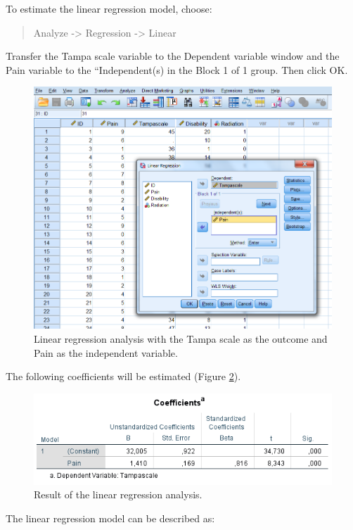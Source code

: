 \documentclass[]{book}
\theoremstyle{definition}
\theoremstyle{definition}
\theoremstyle{definition}
\theoremstyle{remark}
\begin{document}
To estimate the linear regression model, choose:

\begin{quote}
Analyze -\textgreater{} Regression -\textgreater{} Linear
\end{quote}

Transfer the Tampa scale variable to the Dependent variable window and
the Pain variable to the ``Independent(s) in the Block 1 of 1 group.
Then click OK.

\begin{figure}

{\centering \includegraphics[width=0.7\linewidth]{images/fig3.14} 

}

\caption{Linear regression analysis with the Tampa scale as the outcome and Pain as the independent variable.}\label{fig:fig3-14}
\end{figure}

The following coefficients will be estimated (Figure \ref{fig:tab3-3}).

\begin{figure}

{\centering \includegraphics[width=0.7\linewidth]{images/table3.3} 

}

\caption{Result of the linear regression analysis.}\label{fig:tab3-3}
\end{figure}

The linear regression model can be described as:
\end{document}
